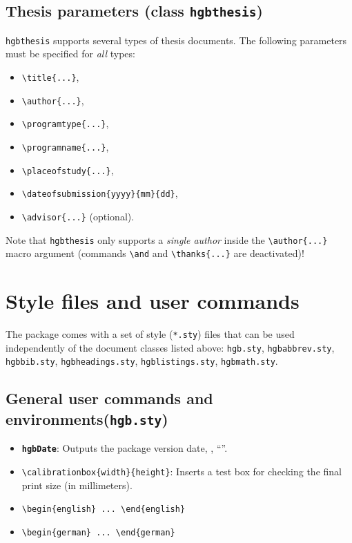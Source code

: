 \documentclass[english]{hgbarticle}
\begin{document}
\subsection{Thesis parameters (class \texttt{hgbthesis})}

\texttt{hgbthesis} supports several types of thesis documents. The following
parameters must be specified for \emph{all} types:
%
\begin{itemize}
    \item \verb!\title{...}!,
    \item \verb!\author{...}!,
    \item \verb!\programtype{...}!,
    \item \verb!\programname{...}!,
    \item \verb!\placeofstudy{...}!,
    \item \verb!\dateofsubmission{yyyy}{mm}{dd}!,
    \item \verb!\advisor{...}! (optional).
\end{itemize}
%
Note that \texttt{hgbthesis} only supports a \emph{single author} inside the
\verb!\author{...}! macro argument (commands \verb!\and! and
\verb!\thanks{...}! are deactivated)!


\section{Style files and user commands}

The package comes with a set of style (\texttt{*.sty}) files that can be used
independently of the document classes listed above:
\texttt{hgb.sty},
\texttt{hgbabbrev.sty},
\texttt{hgbbib.sty},
\texttt{hgbheadings.sty},
\texttt{hgblistings.sty},
\texttt{hgbmath.sty}.


\subsection{General user commands and environments(\texttt{hgb.sty})}

\begin{itemize}
    \item \textbf{\texttt{{\bs}hgbDate}}: Outputs the package version date,
    \eg, ``\texttt{\hgbDate}''.
    \item \verb!\calibrationbox{width}{height}!: Inserts a test box for
    checking the final print size (in millimeters).
    \item \verb!\begin{english} ... \end{english}!
    \item \verb!\begin{german} ... \end{german}!
\end{itemize}
\end{document}
